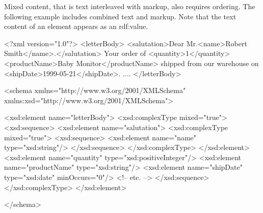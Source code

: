 Mixed content, that is text interleaved with markup, also requires ordering. The following example includes combined text and markup. Note that the text content of an element appears as an rdf:value.


\begin{DoxyCodeInclude}
<?xml version="1.0"?>
<letterBody>
<salutation>Dear Mr.<name>Robert Smith</name>.</salutation>
Your order of <quantity>1</quantity> <productName>Baby
Monitor</productName> shipped from our warehouse on
<shipDate>1999-05-21</shipDate>. ....
</letterBody>


\end{DoxyCodeInclude}
 
\begin{DoxyCodeInclude}
<schema xmlns="http://www.w3.org/2001/XMLSchema"
        xmlns:xsd="http://www.w3.org/2001/XMLSchema">

<xsd:element name="letterBody">
  <xsd:complexType mixed="true">
    <xsd:sequence>
      <xsd:element name="salutation">
        <xsd:complexType mixed="true">
          <xsd:sequence>
            <xsd:element name="name" type="xsd:string"/>
          </xsd:sequence>
        </xsd:complexType>
      </xsd:element>
      <xsd:element name="quantity"    type="xsd:positiveInteger"/>
      <xsd:element name="productName" type="xsd:string"/>
      <xsd:element name="shipDate"    type="xsd:date" minOccurs="0"/>
      <!-- etc. -->
    </xsd:sequence>
  </xsd:complexType>
</xsd:element>

</schema>
\end{DoxyCodeInclude}
 
